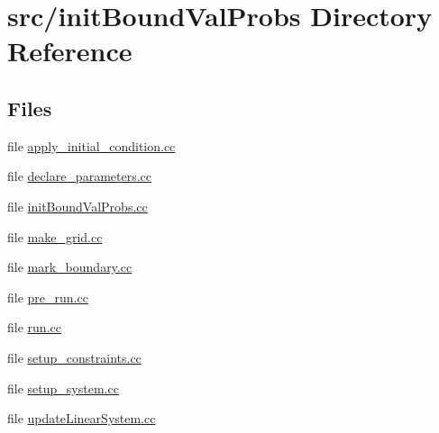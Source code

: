 \section{src/init\-Bound\-Val\-Probs Directory Reference}
\label{dir_b3a8ed2d9c7a6880031a307933fb5a33}
\subsection*{Files}
\begin{DoxyCompactItemize}
\item 
file \hyperlink{apply__initial__condition_8cc}{apply\-\_\-initial\-\_\-condition.\-cc}
\item 
file \hyperlink{init_bound_val_probs_2declare__parameters_8cc}{declare\-\_\-parameters.\-cc}
\item 
file \hyperlink{init_bound_val_probs_8cc}{init\-Bound\-Val\-Probs.\-cc}
\item 
file \hyperlink{make__grid_8cc}{make\-\_\-grid.\-cc}
\item 
file \hyperlink{mark__boundary_8cc}{mark\-\_\-boundary.\-cc}
\item 
file \hyperlink{pre__run_8cc}{pre\-\_\-run.\-cc}
\item 
file \hyperlink{run_8cc}{run.\-cc}
\item 
file \hyperlink{setup__constraints_8cc}{setup\-\_\-constraints.\-cc}
\item 
file \hyperlink{setup__system_8cc}{setup\-\_\-system.\-cc}
\item 
file \hyperlink{update_linear_system_8cc}{update\-Linear\-System.\-cc}
\end{DoxyCompactItemize}
